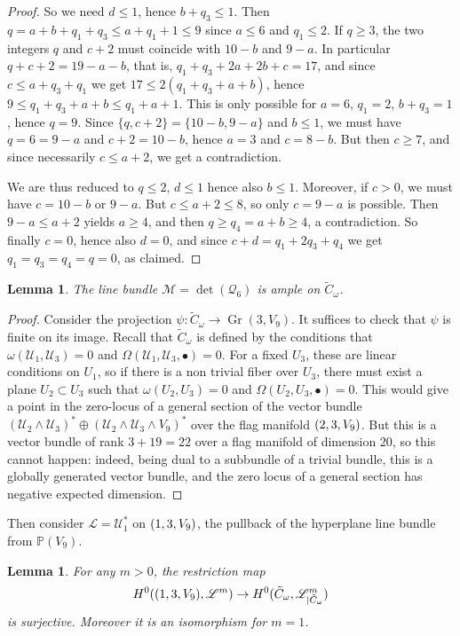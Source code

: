 \documentclass[11pt]{article}
\newcommand{\NoChangel}[1]{%
\expandafter\let\csname old\string#1\endcsname=#1
\let#1=\relax
\newcommand{#1}{\mathcode`l="716C\csname old\string#1\endcsname\mathcode`l="7160 }%
}
\newcommand{\sbullet}{{\scriptstyle\bullet}}
\let\mathcal\mathscr
\theoremstyle{plain}
\newtheorem{lemma}[theorem]{Lemma}
\theoremstyle{definition}
\DeclareMathOperator{\Gr}{Gr}
\DeclareMathOperator{\Fl}{Fl}\NoChangel{\Fl}
\newcommand{\PP}{\mathbb{P}}
\newcommand{\sheaf}[1]{\mathcal{#1}}
\newcommand{\kl}{\sheaf{L}}
\newcommand{\km}{\sheaf{M}}
\newcommand{\kq}{\sheaf{Q}}
\newcommand{\ku}{\sheaf{U}}
\begin{document}
\begin{proof}
So we need $d\le 1$, hence $b+q_3\le 1$. Then $q=a+b+q_1+q_3\le a+q_1+1\le 9$ since $a\le 6$ and
$q_1\le 2$. If $q\ge 3$, the two integers $q$ and $c+2$ must coincide with $10-b$ and $9-a$.
In particular $q+c+2=19-a-b$, that is, $q_1+q_3+2a+2b+c=17$, and since $c\le a+q_3+q_1$ we get
$17\le 2(q_1+q_3+a+b)$, hence $9\le q_1+q_3+a+b\le q_1+a+1$. This is only possible for $a=6$,
$q_1=2$, $b+q_3=1$, hence $q=9$. Since $\{q,c+2\}=\{10-b,9-a\}$ and $b\le 1$, we must have
$q=6=9-a$ and $c+2=10-b$, hence $a=3$ and $c=8-b$. But then $c\ge 7$, and since necessarily
$c\le a+2$, we get a contradiction.

We are thus reduced to $q\le 2$, $d\le 1$ hence also $b\le 1$. Moreover, if $c>0$, we must have
$c=10-b$ or $9-a$.
But $c\le a+2\le 8$, so only $c=9-a$ is possible. Then $9-a\le a+2$ yields $a\ge 4$,
and then $q\ge q_4=a+b\ge 4$, a contradiction. So finally $c=0$, hence also $d=0$, and since $c+d=q_1+2q_3+q_4$ we get $q_1=q_3=q_4=q=0$, as claimed.
\end{proof}

\begin{lemma}\label{ampleness}
The line bundle $\km=\det(\kq_6)$ is ample on $\tilde C_\omega$.
\end{lemma}

\begin{proof}
Consider the projection $\psi : \tilde C_\omega\to \Gr(3,V_9)$. It suffices to check that $\psi$
is finite on its image. Recall that $\tilde C_\omega$ is defined by the conditions that $\omega(\ku_1,\ku_3)=0$ and
$\Omega(\ku_1,\ku_3,\sbullet)=0$. For a fixed $U_3$, these are linear conditions on $U_1$, so if there is a non
trivial fiber over $U_3$, there must exist a plane $U_2\subset U_3$ such that $\omega(U_2,U_3)=0$ and
$\Omega(U_2,U_3,\sbullet)=0$. This would give a point in the zero-locus of a general section of the vector bundle
$(\ku_2\wedge \ku_3)^*\oplus (\ku_2\wedge \ku_3\wedge V_9)^*$ over the flag manifold $\Fl(2,3,V_9)$. But this is
a vector bundle of rank $3+19=22$ over a flag manifold of dimension $20$, so this cannot happen: indeed,
being dual to a subbundle of a trivial bundle, this is a globally generated vector bundle, and
the zero locus of a general section has negative expected dimension.
\end{proof}

Then consider $\kl = \ku_1^*$ on $\Fl(1,3,V_9)$, the pullback of the hyperplane line bundle from $\PP (V_9)$.

\begin{lemma}\label{projnorm}
For any $m>0$, the restriction map \[
H^0(\Fl(1,3,V_9),\kl^m)\to H^0(\tilde C_\omega,\kl_{|\tilde C_\omega}^m)
\] is surjective.
Moreover it is an isomorphism for $m=1$.
\end{lemma}
\end{document}

